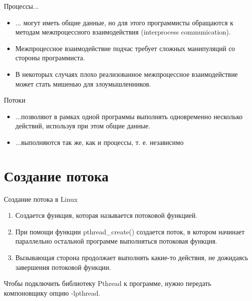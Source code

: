 \documentclass{beamer}
\begin{document}
\begin{frame}
\begin{block}{Процессы...}
\begin{itemize}
\item ... могут иметь общие данные, но для этого программисты обращаются к методам межпроцессного взаимодействия (interprocess communication). 
\item Межпроцессное взаимодействие подчас требует сложных манипуляций со стороны программиста.
\item В некоторых случаях плохо реализованное межпроцессное взаимодействие может стать мишенью для злоумышленников.
\end{itemize}
\end{block}
\begin{block}{Потоки}
\begin{itemize}
\item ...позволяют в рамках одной программы выполнять одновременно несколько
действий, используя при этом общие данные. 
\item ...выполняются так же, как и процессы, т. е. независимо
\end{itemize}
\end{block}
\end{frame}

\section{Создание потока}

\begin{frame}{Создание потока в Linux}
\begin{enumerate}
\item Создается функция, которая называется потоковой функцией.
\item При помощи функции pthread\_create() создается поток, в котором начинает параллельно остальной программе выполняться потоковая функция.
\item Вызывающая сторона продолжает выполнять какие-то действия, не дожидаясь завершения потоковой функции.
\end{enumerate}
Чтобы подключить библиотеку Pthread к программе, нужно передать компоновщику опцию -lpthread.
\end{frame}

\end{document}
